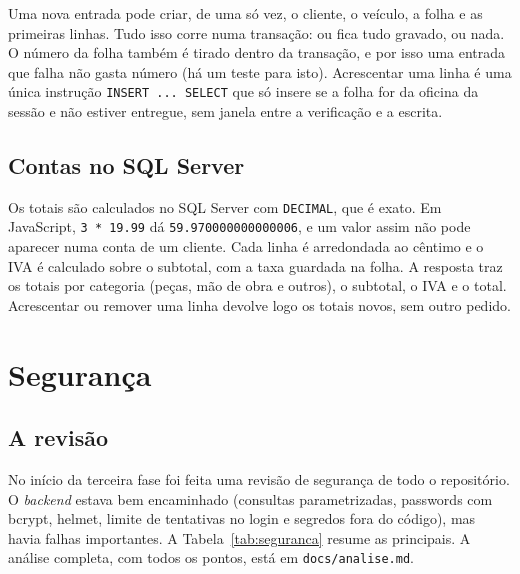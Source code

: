 \documentclass[a4paper,12pt]{article}
\begin{document}
Uma nova entrada pode criar, de uma só vez, o cliente, o veículo, a folha e as primeiras linhas. Tudo isso corre numa transação: ou fica tudo gravado, ou nada. O número da folha também é tirado dentro da transação, e por isso uma entrada que falha não gasta número (há um teste para isto). Acrescentar uma linha é uma única instrução \texttt{INSERT ... SELECT} que só insere se a folha for da oficina da sessão e não estiver entregue, sem janela entre a verificação e a escrita.

\subsection{Contas no SQL Server}

Os totais são calculados no SQL Server com \texttt{DECIMAL}, que é exato. Em JavaScript, \texttt{3 * 19.99} dá \texttt{59.970000000000006}, e um valor assim não pode aparecer numa conta de um cliente. Cada linha é arredondada ao cêntimo e o \ac{IVA} é calculado sobre o subtotal, com a taxa guardada na folha. A resposta traz os totais por categoria (peças, mão de obra e outros), o subtotal, o \ac{IVA} e o total. Acrescentar ou remover uma linha devolve logo os totais novos, sem outro pedido.

\section{Segurança}
\label{sec:seguranca}

\subsection{A revisão}

No início da terceira fase foi feita uma revisão de segurança de todo o repositório. O \textit{backend} estava bem encaminhado (consultas parametrizadas, passwords com bcrypt, helmet, limite de tentativas no login e segredos fora do código), mas havia falhas importantes. A Tabela~\ref{tab:seguranca} resume as principais. A análise completa, com todos os pontos, está em \texttt{docs/analise.md}.
\end{document}
